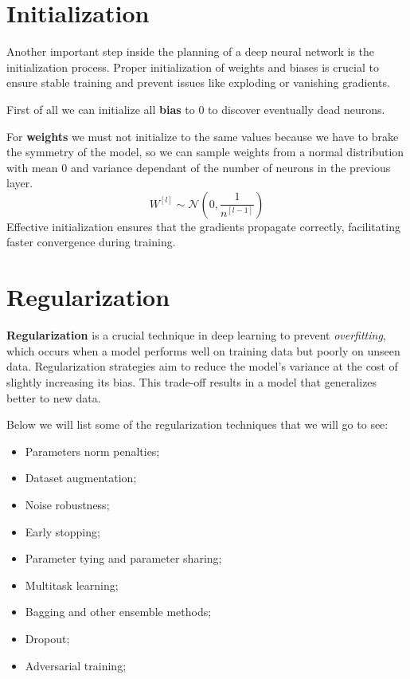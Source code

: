 \section{Initialization}
Another important step inside the planning of a deep neural network is the
initialization process. Proper initialization of weights and biases is crucial
to ensure stable training and prevent issues like exploding or vanishing gradients.

First of all we can initialize all \textbf{bias} to $0$ to discover eventually
dead neurons.

For \textbf{weights} we must not initialize to the same values because we have to
brake the symmetry of the model, so we can sample weights from a normal
distribution with mean $0$ and variance dependant of the number of neurons in
the previous layer.
\begin{equation*}
    W^{[l]} \sim \mathcal{N}\left(0, \frac{1}{n^{[l-1]}}\right)
\end{equation*}
Effective initialization ensures that the gradients propagate correctly,
facilitating faster convergence during training.
\section{Regularization}
\textbf{Regularization} is a crucial technique in deep learning to prevent
\textit{overfitting}, which occurs when a model performs well on training data
but poorly on unseen data. Regularization strategies aim to reduce the model's
variance at the cost of slightly increasing its bias. This trade-off results in
a model that generalizes better to new data.

Below we will list some of the regularization techniques that we will go to see:
\begin{itemize}
    \item Parameters norm penalties;
    \item Dataset augmentation;
    \item Noise robustness;
    \item Early stopping;
    \item Parameter tying and parameter sharing;
    \item Multitask learning;
    \item Bagging and other ensemble methods;
    \item Dropout;
    \item Adversarial training;
\end{itemize}

